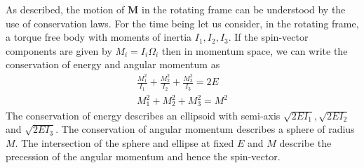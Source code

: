 \documentclass[/home/greg/Thesis/main/main.tex]{subfiles}
\begin{document}
\graphicspath{{/home/greg/Neutron_star_modelling/MotionOfARigidBody/img}}
\newcommand{\MotionOfARigidBodyDir}{/home/greg/Neutron_star_modelling/MotionOfARigidBody}

\newcommand{\dn}{\mathrm{dn}}

\FloatBarrier
As \citet{Landau1969} described, the motion of $\mathbf{M}$ in the rotating frame
can be understood by the use of conservation laws. For the time being let us consider,
in the rotating frame, a torque free body with moments of inertia $I_{1}, I_{2}, I_{3}$. 
If the spin-vector components are given by $M_{i} = I_{i} \Omega_{i}$ then 
in momentum space, we can write the conservation of energy and angular momentum as
\begin{align}
    \frac{M_{1}^{2}}{I_{1}} + \frac{M_{2}^{2}}{I_{2}} + \frac{M_{3}^{2}}{I_{3}} = 2E 
    \label{eqn: ellipse} \\
    M_{1}^{2} + M_{2}^{2} + M_{3}^{2} = M^{2}
    \label{eqn: sphere}
\end{align}
The conservation of energy describes an ellipsoid with semi-axis
$\sqrt{2EI_{1}}, \sqrt{2EI_{2}}$ and $\sqrt{2EI_{3}}$. The conservation of 
angular momentum describes a sphere of radius $M$. The intersection of the
sphere and ellipse at fixed $E$ and $M$ describe the precession of the angular
momentum and hence the spin-vector.
\end{document}
